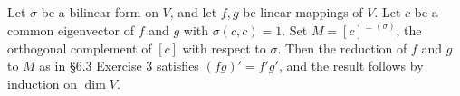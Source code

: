 Let $\sigma$ be a bilinear form on $V$, and let $f, g$ be linear mappings of $V$. Let $c$ be a common eigenvector of $f$ and $g$ with $\sigma(c, c) = 1$. Set $M = [c]^{\perp(\sigma)}$, the orthogonal complement of $[c]$ with respect to $\sigma$. Then the reduction of $f$ and $g$ to $M$ as in §6.3 Exercise 3 satisfies $(fg)' = f'g'$, and the result follows by induction on $\dim V$.
